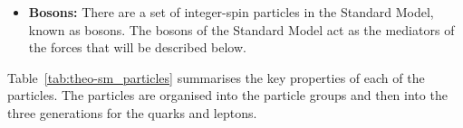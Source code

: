\begin{itemize}[leftmargin=*]
\item\textbf{Bosons:}
  There are a set of integer-spin particles in the Standard Model, known as bosons.
  The bosons of the Standard Model act as the mediators of the forces that will be described below.  \vspace{0.5em}
  
\end{itemize}
  
  \vspace{-1em}

Table~\ref{tab:theo-sm_particles} summarises the key properties of each of the particles.
The particles are organised into the particle groups
and then into the three generations for the quarks and leptons.

